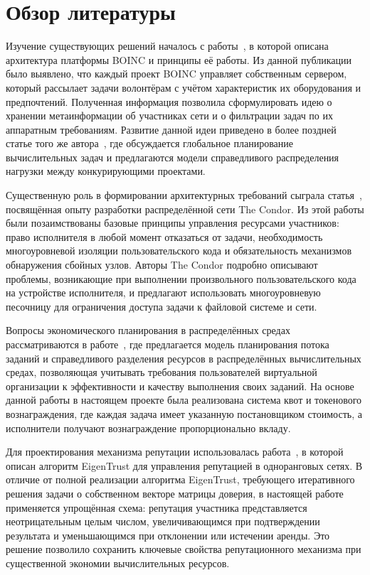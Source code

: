 \documentclass[a4paper,11pt]{extarticle}
\begin{document}
\section{Обзор литературы}

Изучение существующих решений началось с работы~\cite{anderson_boinc}, в которой
описана архитектура платформы BOINC и принципы её работы. Из данной публикации
было выявлено, что каждый проект BOINC управляет собственным сервером, который
рассылает задачи волонтёрам с учётом характеристик их оборудования и
предпочтений. Полученная информация позволила сформулировать идею о хранении
метаинформации об участниках сети и о фильтрации задач по их аппаратным
требованиям. Развитие данной идеи приведено в более поздней статье того же
автора~\cite{boinc_article}, где обсуждается глобальное планирование
вычислительных задач и предлагаются модели справедливого распределения нагрузки
между конкурирующими проектами.

Существенную роль в формировании архитектурных требований сыграла
статья~\cite{The_Condor_Experience}, посвящённая опыту разработки распределённой
сети The Condor. Из этой работы были позаимствованы базовые принципы управления
ресурсами участников: право исполнителя в любой момент отказаться от задачи,
необходимость многоуровневой изоляции пользовательского кода и обязательность
механизмов обнаружения сбойных узлов. Авторы The Condor подробно описывают
проблемы, возникающие при выполнении произвольного пользовательского кода на
устройстве исполнителя, и предлагают использовать многоуровневую песочницу для
ограничения доступа задачи к файловой системе и сети.

Вопросы экономического планирования в распределённых средах рассматриваются в
работе~\cite{economic_model_article}, где предлагается модель планирования
потока заданий и справедливого разделения ресурсов в распределённых
вычислительных средах, позволяющая учитывать требования пользователей виртуальной
организации к эффективности и качеству выполнения своих заданий. На основе данной
работы в настоящем проекте была реализована система квот и токенового
вознаграждения, где каждая задача имеет указанную постановщиком стоимость, а
исполнители получают вознаграждение пропорционально вкладу.

Для проектирования механизма репутации использовалась работа~\cite{eigentrust},
в которой описан алгоритм EigenTrust для управления репутацией в одноранговых
сетях. В отличие от полной реализации алгоритма EigenTrust, требующего
итеративного решения задачи о собственном векторе матрицы доверия, в настоящей
работе применяется упрощённая схема: репутация участника представляется
неотрицательным целым числом, увеличивающимся при подтверждении результата и
уменьшающимся при отклонении или истечении аренды. Это решение позволило
сохранить ключевые свойства репутационного механизма при существенной экономии
вычислительных ресурсов.
\end{document}
